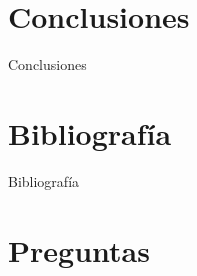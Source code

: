 \documentclass{beamer}
\begin{document}
\section{Conclusiones}
\begin{frame}{Conclusiones}


\end{frame}

\section{Bibliografía}
\begin{frame}[allowframebreaks]{Bibliografía}

\scriptsize
\begin{thebibliography}{9}


\end{thebibliography}


\end{frame}


\section{Preguntas}
\end{document}
